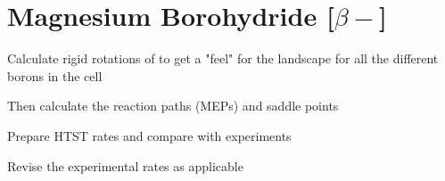 \section{Magnesium Borohydride [$\beta-$]}
\label{sec:borohydrides-magnesium}

\bit
\item Calculate rigid rotations of  to get a "feel" for the landscape for all the different borons in the cell
\item Then calculate the reaction paths (MEPs) and saddle points
\item Prepare HTST rates and compare with experiments
\item Revise the experimental rates as applicable
\eit

\placeholder
